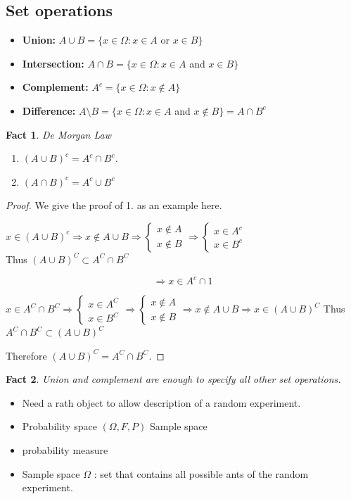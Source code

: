\subsection{Set operations}
\begin{itemize}
  \item \textbf{Union:} \(A \cup B=\{x \in \Omega: x \in A\) or \(x \in B\}\)
  \item \textbf{Intersection:} \(A \cap B=\{x \in \Omega: x \in A\) and \(x \in B\}\)
  \item \textbf{Complement:} \(A^{c}=\{x \in \Omega: x \notin A\}\)
  \item \textbf{Difference:} \(A \setminus B=\{x \in \Omega: x \in A\) and \(x \notin B\}=A \cap B^{c}\)
\end{itemize}

\newtheorem{fact}{Fact}

\begin{fact}{De Morgan Law}
\begin{enumerate}
\item \((A \cup B)^{c}=A^{c} \cap B^{c}\).
\item \((A \cap B)^{c}=A^{c} \cup B^{c}\)
\end{enumerate}
\end{fact}
\begin{proof}
We give the proof of 1. as an example here.

\(x \in(A \cup B)^{c} \Rightarrow x \notin A \cup B \Rightarrow\left\{\begin{array}{l}x \notin A \\ x \notin B\end{array} \Rightarrow\left\{\begin{array}{l}x \in A^{c} \\ x \in B^{c}\end{array}\right.\right.\)\\
Thus \((A \cup B)^{C} \subset A^{C} \cap B^{C}\)

\[
\Rightarrow x \in A^{c} \cap 1
\]

\(x \in A^{C} \cap B^{C} \Rightarrow\left\{\begin{array}{l}x \in A^{C} \\ x \in B^{C}\end{array} \Rightarrow\left\{\begin{array}{l}x \notin A \\ x \notin B\end{array} \Rightarrow x \notin A \cup B \Rightarrow x \in(A \cup B)^{C}\right.\right.\) Thus \(A^{C} \cap B^{C} \subset(A \cup B)^{C}\)

Therefore \((A \cup B)^{C}=A^{C} \cap B^{C}\).
\end{proof}
\begin{fact}
Union and complement are enough to specify all other set operations.
\end{fact}



\begin{itemize}
  \item[-] Need a rath object to allow description of a random experiment.
  \item[-] Probability space \((\Omega, F, P)\) Sample space
  \item[] probability measure
  \item[-] Sample space \(\Omega\) : set that contains all possible ants of the random experiment.
\end{itemize}

